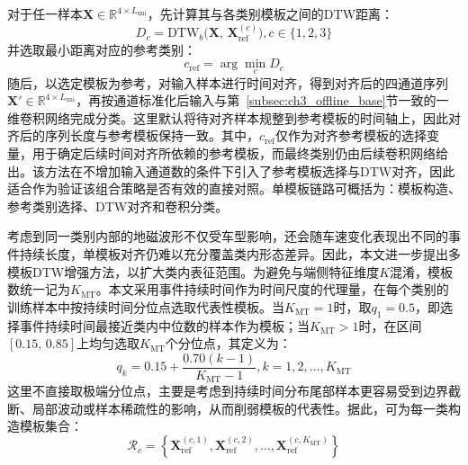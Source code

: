 \documentclass{xdupgthesis}
\begin{document}
对于任一样本$\mathbf{X}\in\mathbb{R}^{4\times L_{\mathrm{uni}}}$，先计算其与各类别模板之间的DTW距离：
\begin{equation}
    D_c=\mathrm{DTW}_{b}\big(\mathbf{X},\,\mathbf{X}_{\mathrm{ref}}^{(c)}\big), c\in\{1,2,3\}
\end{equation}
并选取最小距离对应的参考类别：
\begin{equation}
    c_{\mathrm{ref}}=\arg\min_c D_c
\end{equation}
随后，以选定模板为参考，对输入样本进行时间对齐，得到对齐后的四通道序列$\mathbf{X}'\in\mathbb{R}^{4\times L_{\mathrm{uni}}}$，再按通道标准化后输入与第~\ref{subsec:ch3_offline_base}节一致的一维卷积网络完成分类。这里默认将待对齐样本规整到参考模板的时间轴上，因此对齐后的序列长度与参考模板保持一致。其中，$c_{\mathrm{ref}}$仅作为对齐参考模板的选择变量，用于确定后续时间对齐所依赖的参考模板，而最终类别仍由后续卷积网络给出。该方法在不增加输入通道数的条件下引入了参考模板选择与DTW对齐，因此适合作为验证该组合策略是否有效的直接对照。单模板链路可概括为：模板构造、参考类别选择、DTW对齐和卷积分类。

考虑到同一类别内部的地磁波形不仅受车型影响，还会随车速变化表现出不同的事件持续长度，单模板对齐仍难以充分覆盖类内形态差异。因此，本文进一步提出多模板DTW增强方法，以扩大类内表征范围\cite{chang2021dpdtw,zhang2023tsc_review}。为避免与端侧特征维度$K$混淆，模板数统一记为$K_{\mathrm{MT}}$。本文采用事件持续时间作为时间尺度的代理量，在每个类别的训练样本中按持续时间分位点选取代表性模板。当$K_{\mathrm{MT}}=1$时，取$q_1=0.5$，即选择事件持续时间最接近类内中位数的样本作为模板；当$K_{\mathrm{MT}}>1$时，在区间$[0.15,\,0.85]$上均匀选取$K_{\mathrm{MT}}$个分位点，其定义为：
\begin{equation}
    q_k=0.15+\frac{0.70(k-1)}{K_{\mathrm{MT}}-1}, k=1,2,\ldots,K_{\mathrm{MT}}
\end{equation}
这里不直接取极端分位点，主要是考虑到持续时间分布尾部样本更容易受到边界截断、局部波动或样本稀疏性的影响，从而削弱模板的代表性。据此，可为每一类构造模板集合：
\begin{equation}
    \mathcal{R}_c=
    \left\{
    \mathbf{X}_{\mathrm{ref}}^{(c,1)},
    \mathbf{X}_{\mathrm{ref}}^{(c,2)},
    \ldots,
    \mathbf{X}_{\mathrm{ref}}^{(c,K_{\mathrm{MT}})}
    \right\}
\end{equation}
\end{document}
